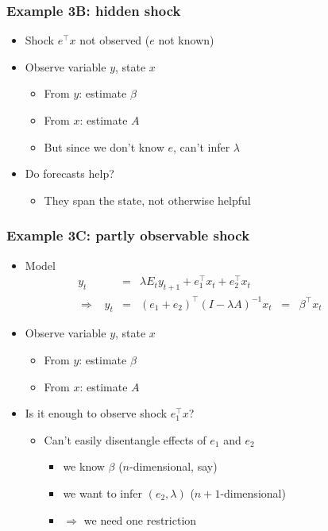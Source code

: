 \documentclass{beamer}
\begin{document}
\begin{frame}
\frametitle{Example 3B: hidden shock}
\begin{itemize}  \itemsep=\bigskipamount
\item Shock $e^\top x$ not observed ($e$ not known)
\item Observe variable $y$, state $x$ \\
\begin{itemize}
\item From $y$:  estimate $\beta$
\item From $x$:  estimate $A$
\item But since we don't know $e$, can't infer $\lambda$
\end{itemize}
\item Do forecasts help? \\
\begin{itemize}
\item They span the state, not otherwise helpful
\end{itemize}
\end{itemize}
\end{frame}

\begin{frame}
\frametitle{Example 3C: partly observable shock}
\begin{itemize}  \itemsep=\bigskipamount
\item Model
\begin{eqnarray*}
    y_t &=& \lambda E_t y_{t+1} + e_1^\top x_{t} + e_2^\top x_{t}
    \\
   \Rightarrow  \;\;\;
    y_t &=&  (e_1+e_2)^\top (I-\lambda A)^{-1} x_t \;\;=\;\; \beta^\top x_t
    \phantom{xxxxx}
\end{eqnarray*}
\item Observe variable $y$, state $x$ \\
\begin{itemize}
\item From $y$:  estimate $\beta$
\item From $x$:  estimate $A$
\end{itemize}
\item Is it enough to observe shock $e_1^\top x$?  \\
\begin{itemize}
\item Can't easily disentangle effects of $e_1$ and $e_2$ \\
\begin{itemize}
\item we know $\beta$ ($n$-dimensional, say)
\item we want to infer $(e_2,\lambda)$ ($n+1$-dimensional)
\item $\Rightarrow$ we need one restriction
\end{itemize}
\end{itemize}
\end{itemize}
\end{frame}
\end{document}
